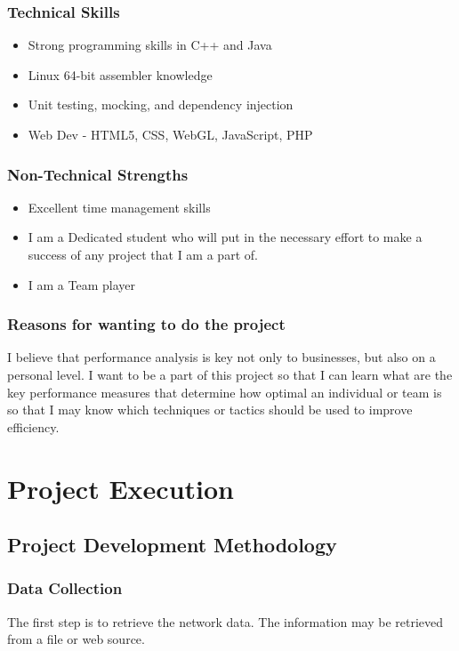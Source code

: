 \documentclass[a4paper,12pt]{article}
\begin{document}
\subsubsection{Technical Skills}
\begin{itemize}
    \item Strong programming skills in C++ and Java
    \item Linux 64-bit assembler knowledge
    \item Unit testing, mocking, and dependency injection
    \item Web Dev - HTML5, CSS, WebGL, JavaScript, PHP
\end{itemize}
\subsubsection{Non-Technical Strengths}
\begin{itemize}
    \item Excellent time management skills
    \item I am a Dedicated student who will put in the necessary effort to make a success of any project that I am a part of.
    \item I am a Team player
\end{itemize}
\subsubsection{Reasons for wanting to do the project}
I believe that performance analysis is key not only to businesses, but also on a personal level. I want to be a part of this project so that I can learn what are the key performance measures that determine how optimal an 
individual or team is so that I may know which techniques or tactics should be used to improve efficiency.

\section{Project Execution}
\subsection{Project Development Methodology}
\label{Project Design Methodology}
\subsubsection{Data Collection}
The first step is to retrieve the network data. The information may be retrieved from a file or web source.
\end{document}
